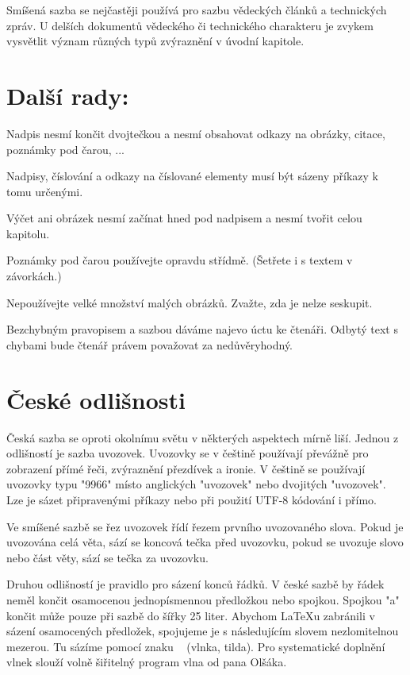 \documentclass[czech,a4paper,10pt,twocolumn]{article}
\begin{document}
Smíšená sazba se nejčastěji používá pro sazbu vědeckých článků a technických zpráv. U delších dokumentů vědeckého či technického charakteru je zvykem vysvětlit význam různých typů zvýraznění v úvodní kapitole.

\section{Další rady:}

Nadpis nesmí končit dvojtečkou a nesmí obsahovat odkazy na obrázky, citace, poznámky pod čarou, ...

Nadpisy, číslování a odkazy na číslované elementy musí být sázeny příkazy k tomu určenými.

Výčet ani obrázek nesmí začínat hned pod nadpisem a nesmí tvořit celou kapitolu.

Poznámky pod čarou používejte opravdu střídmě. (Šetřete i s textem v závorkách.)

Nepoužívejte velké množství malých obrázků. Zvažte, zda je nelze seskupit.

Bezchybným pravopisem a sazbou dáváme najevo úctu ke čtenáři. Odbytý text s chybami bude čtenář právem považovat za nedůvěryhodný.


\section{České odlišnosti}

Česká sazba se oproti okolnímu světu v některých aspektech mírně liší. Jednou z odlišností je sazba uvozovek. Uvozovky se v češtině používají převážně pro zobrazení přímé řeči, zvýraznění přezdívek a ironie. V češtině se používají uvozovky typu "9966" místo anglických "uvozovek" nebo dvojitých "uvozovek". Lze je sázet připravenými příkazy nebo při použití UTF-8 kódování i přímo.

Ve smíšené sazbě se řez uvozovek řídí řezem prvního uvozovaného slova. Pokud je uvozována celá věta, sází se koncová tečka před uvozovku, pokud se uvozuje slovo nebo část věty, sází se tečka za uvozovku.

Druhou odlišností je pravidlo pro sázení konců řádků. V české sazbě by řádek neměl končit osamocenou jednopísmennou předložkou nebo spojkou. Spojkou "a" končit může pouze při sazbě do šířky 25 liter. Abychom LaTeXu zabránili v sázení osamocených předložek, spojujeme je s následujícím slovem nezlomitelnou mezerou. Tu sázíme pomocí znaku ~ (vlnka, tilda). Pro systematické doplnění vlnek slouží volně šiřitelný program vlna od pana Olšáka.
\end{document}
